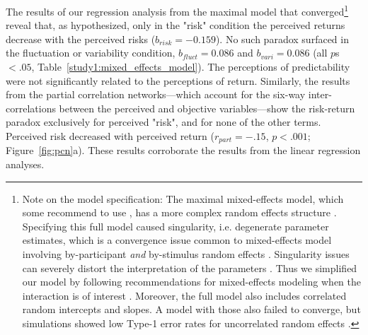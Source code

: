 \documentclass[a4paper,man, natbib,floatsintext]{apa6} %
\begin{document}
The results of our regression analysis from the maximal model that converged\footnote{Note on the model specification: The maximal mixed-effects model, which some recommend to use \citep{Barr2013a}, has a more complex random effects structure \citep[see][]{Judd2017}. Specifying this full model caused singularity, i.e. degenerate parameter estimates, which is a convergence issue common to mixed-effects model involving by-participant \textit{and} by-stimulus random effects \citep{Bates2015b}. Singularity issues can severely distort the interpretation of the parameters \citep{Bates2015b}. Thus we simplified our model by following recommendations for mixed-effects modeling when the interaction is of interest \citep{Barr2013a}. Moreover, the full model also includes correlated random intercepts and slopes. A model with those also failed to converge, but simulations showed low Type-1 error rates for uncorrelated random effects \citep{Matuschek2017}.}
reveal that, as hypothesized, only in the "risk" condition the perceived returns decrease with the perceived risks ($b_{risk}=-0.159$). No such paradox surfaced in the fluctuation or variability condition, $b_{fluct}=0.086$ and $b_{vari}=0.086$ (all $p$s$<.05$, Table~\ref{study1:mixed_effects_model}).
The perceptions of predictability were not significantly related to the perceptions of return. Similarly, the results from the partial correlation networks---which account for the six-way inter-correlations between the perceived and objective variables---show the risk-return paradox exclusively for perceived "risk", and for none of the other terms. Perceived risk decreased with perceived return ($r_{part} = -.15$, $p < .001$; Figure~\ref{fig:pcn}a). These results corroborate the results from the linear regression analyses.
 
\end{document}
